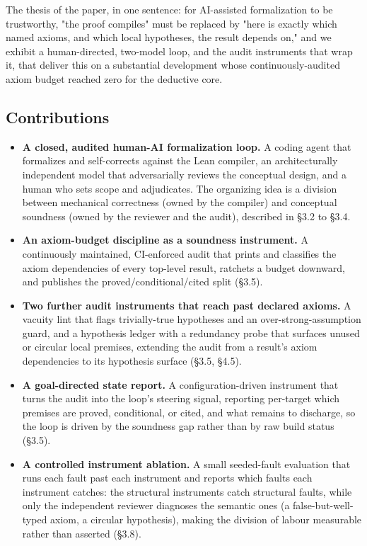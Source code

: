 \documentclass[11pt]{article}
\begin{document}
The thesis of the paper, in one sentence: for AI-assisted formalization to be trustworthy, "the
proof compiles" must be replaced by "here is exactly which named axioms, and which local hypotheses,
the result depends on," and we exhibit a human-directed, two-model loop, and the audit instruments
that wrap it, that deliver this on a substantial development whose continuously-audited axiom budget
reached zero for the deductive core.

\subsection{Contributions}

\begin{itemize}
  \item \textbf{A closed, audited human-AI formalization loop.} A coding agent that formalizes and self-corrects against the Lean compiler, an architecturally independent model that adversarially reviews the conceptual design, and a human who sets scope and adjudicates. The organizing idea is a division between mechanical correctness (owned by the compiler) and conceptual soundness (owned by the reviewer and the audit), described in §3.2 to §3.4.
  \item \textbf{An axiom-budget discipline as a soundness instrument.} A continuously maintained, CI-enforced audit that prints and classifies the axiom dependencies of every top-level result, ratchets a budget downward, and publishes the proved/conditional/cited split (§3.5).
  \item \textbf{Two further audit instruments that reach past declared axioms.} A vacuity lint that flags trivially-true hypotheses and an over-strong-assumption guard, and a hypothesis ledger with a redundancy probe that surfaces unused or circular local premises, extending the audit from a result's axiom dependencies to its hypothesis surface (§3.5, §4.5).
  \item \textbf{A goal-directed state report.} A configuration-driven instrument that turns the audit into the loop's steering signal, reporting per-target which premises are proved, conditional, or cited, and what remains to discharge, so the loop is driven by the soundness gap rather than by raw build status (§3.5).
  \item \textbf{A controlled instrument ablation.} A small seeded-fault evaluation that runs each fault past each instrument and reports which faults each instrument catches: the structural instruments catch structural faults, while only the independent reviewer diagnoses the semantic ones (a false-but-well-typed axiom, a circular hypothesis), making the division of labour measurable rather than asserted (§3.8).

\end{itemize}
\end{document}
